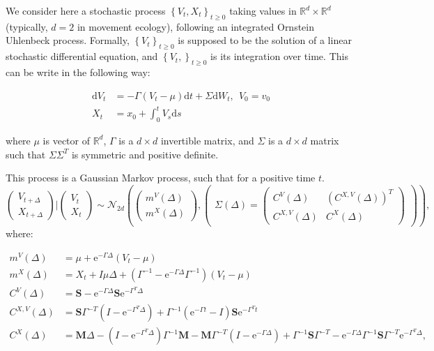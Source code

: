 \documentclass[]{book}
\newcommand{\rmd}{\text{d}}
\newcommand{\e}{\text{e}}
\newcommand{\inv}{^{-1}}
\newcommand{\Sinf}{\mathbf{S}}
\newcommand{\M}{\mathbf{M}}
\begin{document}
We consider here a stochastic process
\(\left\lbrace V_t, X_t \right\rbrace_{t \geq 0}\) taking values in
\(\mathbb{R}^{d}\times \mathbb{R}^{d}\) (typically, \(d = 2\) in
movement ecology), following an integrated Ornstein Uhlenbeck process.
Formally, \(\left\lbrace V_t \right\rbrace_{t \geq 0}\) is supposed to
be the solution of a linear stochastic differential equation, and
\(\left\lbrace V_t, \right\rbrace_{t \geq 0}\) is its integration over
time. This can be write in the following way:

\begin{equation}
\begin{array}{rl}
\rmd V_t &= -\Gamma \left( V_t - \mu \right)\rmd t + \Sigma \rmd W_t,~~V_0 = v_0\\
X_t &= x_0 + \int_0^t V_s \rmd s
\end{array}
\label{eq:IOU-SDE}
\end{equation}

where \(\mu\) is vector of \(\mathbb{R}^d\), \(\Gamma\) is a
\(d \times d\) invertible matrix, and \(\Sigma\) is a \(d \times d\)
matrix such that \(\Sigma\Sigma^T\) is symmetric and positive definite.

This process is a Gaussian Markov process, such that for a positive time
\(t\). \[\begin{pmatrix}
V_{t + \Delta}\\
X_{t + \Delta}
\end{pmatrix} \vert \begin{pmatrix}
V_{t} \\
X_{t}
\end{pmatrix} \sim \mathcal{N}_{2d}\left( \begin{pmatrix}
m^V(\Delta)\\
m^X(\Delta)
\end{pmatrix}, \begin{pmatrix}
\Sigma(\Delta) = \begin{pmatrix}
C^{V}(\Delta) & \left(C^{X, V}(\Delta)\right)^T\\
C^{X, V}(\Delta) & C^{X}(\Delta)
\end{pmatrix}
\end{pmatrix} \right), \] where:

\begin{align*}
m^V(\Delta) &= \mu + \e^{-\Gamma \Delta} (V_t - \mu)\\
m^X(\Delta) &= X_t + I\mu \Delta + (\Gamma\inv -  \e^{-\Gamma \Delta}\Gamma\inv)(V_t - \mu)\\
 C^V(\Delta) &= \Sinf -\e^{-\Gamma \Delta}\Sinf \e^{-\Gamma^T \Delta}\\
 C^{X,V}(\Delta) &= \Sinf \Gamma^{-T}\left(I - \e^{-\Gamma^T \Delta}\right) + \Gamma\inv\left(\e^{-\Gamma t} - I\right)\Sinf  \e^{-\Gamma^T t}\\
 C^X(\Delta) &= \M \Delta - \left(I - \e^{-\Gamma^T \Delta}\right)\Gamma\inv \M - \M\Gamma^{-T}\left(I - \e^{-\Gamma \Delta}\right)+ \Gamma\inv \Sinf \Gamma^{-T} - 
   \e^{-\Gamma \Delta}\Gamma\inv\Sinf\Gamma^{-T}\e^{-\Gamma^T \Delta},
\end{align*}
\end{document}
